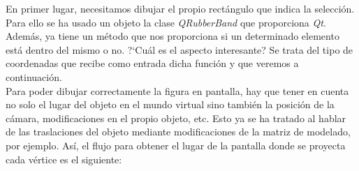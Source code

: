 En primer lugar, necesitamos dibujar el propio rectángulo que indica la selección. Para ello se ha usado un objeto la clase \textit{QRubberBand} que proporciona \textit{Qt}. Además, ya tiene un método que nos proporciona si un determinado elemento está dentro del mismo o no. ?`Cuál es el aspecto interesante? Se trata del tipo de coordenadas que recibe como entrada dicha función y que veremos a continuación. \\

Para poder dibujar correctamente la figura en pantalla, hay que tener en cuenta no solo el lugar del objeto en el mundo virtual sino también la posición de la cámara, modificaciones en el propio objeto, etc. Esto ya se ha tratado al hablar de las traslaciones del objeto mediante modificaciones de la matriz de modelado, por ejemplo. Así, el flujo para obtener el lugar de la pantalla donde se proyecta cada vértice es el siguiente:

